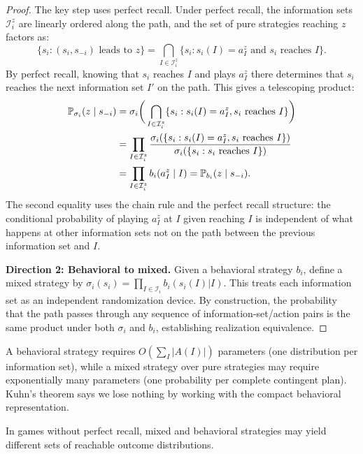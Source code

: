 \documentclass[11pt,a4paper]{article}
\begin{document}
\begin{proof}
The key step uses perfect recall. Under perfect recall, the information sets
$\mathcal{I}_i^z$ are linearly ordered along the path, and the set of pure
strategies reaching $z$ factors as:
\[
    \{s_i : (s_i, s_{-i}) \text{ leads to } z\}
    = \bigcap_{I \in \mathcal{I}_i^z} \{s_i : s_i(I) = a_I^z
    \text{ and } s_i \text{ reaches } I\}.
\]
By perfect recall, knowing that $s_i$ reaches $I$ and plays $a_I^z$ there
determines that $s_i$ reaches the next information set $I'$ on the path.
This gives a telescoping product:
\begin{align*}
    \mathbb{P}_{\sigma_i}(z \mid s_{-i})
    &= \sigma_i\bigg(\bigcap_{I \in \mathcal{I}_i^z}
    \{s_i : s_i(I) = a_I^z, s_i \text{ reaches } I\}\bigg) \\
    &= \prod_{I \in \mathcal{I}_i^z}
    \frac{\sigma_i(\{s_i : s_i(I) = a_I^z, s_i \text{ reaches } I\})}
    {\sigma_i(\{s_i : s_i \text{ reaches } I\})} \\
    &= \prod_{I \in \mathcal{I}_i^z} b_i(a_I^z \mid I)
    = \mathbb{P}_{b_i}(z \mid s_{-i}).
\end{align*}
The second equality uses the chain rule and the perfect recall structure: the
conditional probability of playing $a_I^z$ at $I$ given reaching $I$ is
independent of what happens at other information sets not on the path
between the previous information set and $I$.

\textbf{Direction 2: Behavioral to mixed.}
Given a behavioral strategy $b_i$, define a mixed strategy by
$\sigma_i(s_i) = \prod_{I \in \mathcal{I}_i} b_i(s_i(I) | I)$.
This treats each information set as an independent randomization device.
By construction, the probability that the path passes through any sequence
of information-set/action pairs is the same product under both $\sigma_i$
and $b_i$, establishing realization equivalence.
\end{proof}

\begin{remark}
\label{rem:kuhn_computational}
A behavioral strategy requires $O(\sum_I |A(I)|)$ parameters (one
distribution per information set), while a mixed strategy over pure strategies
may require exponentially many parameters (one probability per complete
contingent plan). Kuhn's theorem says we lose nothing by working with the
compact behavioral representation.
\end{remark}

\begin{proposition}
\label{prop:no_perfect_recall}
In games without perfect recall, mixed and behavioral strategies may yield
different sets of reachable outcome distributions.
\end{proposition}
\end{document}
